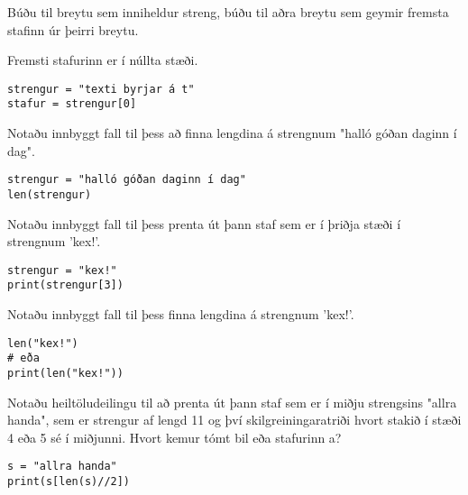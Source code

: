 \begin{exercise}\label{str2}
	Búðu til breytu sem inniheldur streng, búðu til aðra breytu sem geymir fremsta stafinn úr þeirri breytu.
\end{exercise}
\begin{Answer}[ref={str2}]
	Fremsti stafurinn er í núllta stæði.
	\begin{lstlisting}
strengur = "texti byrjar á t"
stafur = strengur[0]\end{lstlisting}
\end{Answer}

\begin{exercise}\label{str3}
	Notaðu innbyggt fall til þess að finna lengdina á strengnum "halló góðan daginn í dag".
\end{exercise}
\begin{Answer}[ref={str3}]
	\begin{lstlisting}
strengur = "halló góðan daginn í dag"
len(strengur)\end{lstlisting}
\end{Answer}

\begin{exercise}\label{str4}
	Notaðu innbyggt fall til þess prenta út þann staf sem er í þriðja stæði í strengnum 'kex!'.
\end{exercise}
\begin{Answer}[ref={str4}]
\begin{lstlisting}
strengur = "kex!"
print(strengur[3])\end{lstlisting}
\end{Answer}

\begin{exercise}\label{str4-5}
	Notaðu innbyggt fall til þess finna lengdina á strengnum 'kex!'.
\end{exercise}
\begin{Answer}[ref={str4-5}]
\begin{lstlisting}
len("kex!")
# eða
print(len("kex!"))\end{lstlisting}
\end{Answer}

\begin{exercise}\label{str5}
	Notaðu heiltöludeilingu til að prenta út þann staf sem er í miðju strengsins "allra handa", sem er strengur af lengd 11 og því skilgreiningaratriði hvort stakið í stæði 4 eða 5 sé í miðjunni.
	Hvort kemur tómt bil eða stafurinn a?
\end{exercise}
\begin{Answer}[ref={str5}]
\begin{lstlisting}
s = "allra handa"
print(s[len(s)//2])\end{lstlisting}
\end{Answer}

